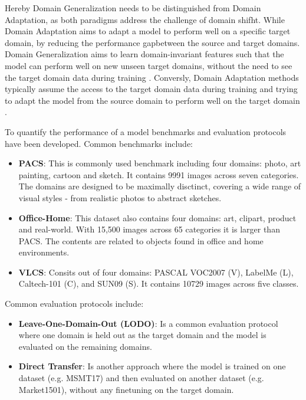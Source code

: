 Hereby Domain Generalization needs to be distinguished from Domain Adaptation, as both paradigms address the challenge of domain shifht. While Domain Adaptation aims to adapt a model to perform well on a specific target domain, by reducing the performance gapbetween the source and target domains. Domain Generalization aims to learn domain-invariant features such that the model can perform well on new unseen target domains, without the need to see the target domain data during training \cite{liDeeperBroaderArtier2017}. Conversly, Domain Adaptation methods typically assume the access to the target domain data during training and trying to adapt the model from the source domain to perform well on the target domain \cite{liuDEJAVUContinual2023, wangDeepVisualDomain2018}. 

To quantify the performance of a model benchmarks and evaluation protocols have been developed. Common benchmarks include:
\begin{itemize}
    \item \textbf{PACS}: \cite{liDeeperBroaderArtier2017} This is commonly used benchmark including four domains: photo, art painting, cartoon and sketch. It contains 9991 images across seven categories. The domains are designed to be maximally disctinct, covering a wide range of visual styles - from realistic photos to abstract sketches.
    \item \textbf{Office-Home}: \cite{venkateswaraDeepHashingNetwork2017} This dataset also contains four domains: art, clipart, product and real-world. With 15,500 images across 65 categories it is larger than PACS. The contents are related to objects found in office and home environments.
    \item \textbf{VLCS}: Consits out of four domains: PASCAL VOC2007 (V), LabelMe (L), Caltech-101 (C), and SUN09 (S). It contains 10729 images across five classes. %

\end{itemize}
Common evaluation protocols include:
\begin{itemize}
    \item \textbf{Leave-One-Domain-Out (LODO)}: Is a common evaluation protocol where one domain is held out as the target domain and the model is evaluated on the remaining domains. \cite{liDeeperBroaderArtier2017}
    \item \textbf{Direct Transfer}: Is another approach where the model is trained on one dataset (e.g. MSMT17) and then evaluated on another dataset (e.g. Market1501), without any finetuning on the target domain. \cite{chongLearningDomainInvariant2021}
\end{itemize}

